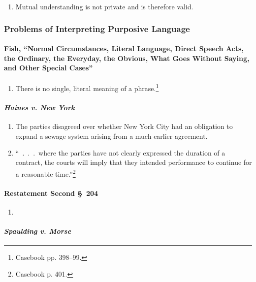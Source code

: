 \begin{enumerate}
    \item Mutual understanding is not private and is therefore valid.
\end{enumerate}

\subsubsection{Problems of Interpreting Purposive Language}

\paragraph{Fish, ``Normal Circumstances, Literal Language, Direct Speech 
Acts, the Ordinary, the Everyday, the Obvious, What Goes Without Saying, and 
Other Special Cases''}

\begin{enumerate}
    \item There is no single, literal meaning of a phrase.\footnote{Casebook 
    pp. 398--99.}
\end{enumerate}

\paragraph{\emph{Haines v. New York}}

\begin{enumerate}
    \item The parties disagreed over whether New York City had an obligation 
    to expand a sewage system arising from a much earlier agreement.
    \item ``~.~.~.~where the parties have not clearly expressed the duration 
    of a contract, the courts will imply that they intended performance to 
    continue for a reasonable time.''\footnote{Casebook p. 401.}
\end{enumerate}

\paragraph{Restatement Second \S\ 204}

\begin{enumerate}
    \item %
\end{enumerate}

\paragraph{\emph{Spaulding v. Morse}}

